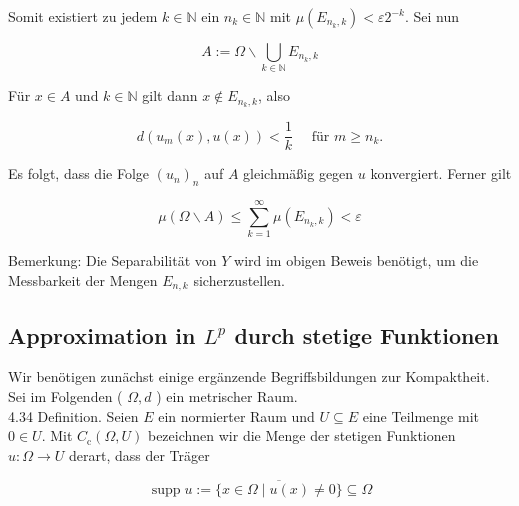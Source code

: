 \documentclass[10pt, letterpaper]{article}
\begin{document}
Somit existiert zu jedem $k \in \mathbb{N}$ ein $n_{k} \in \mathbb{N}$ mit $\mu\left(E_{n_{k}, k}\right)<\varepsilon 2^{-k}$. Sei nun

$$
A:=\Omega \backslash \bigcup_{k \in \mathbb{N}} E_{n_{k}, k}
$$

Für $x \in A$ und $k \in \mathbb{N}$ gilt dann $x \notin E_{n_{k}, k}$, also

$$
d\left(u_{m}(x), u(x)\right)<\frac{1}{k} \quad \text { für } m \geq n_{k} .
$$

Es folgt, dass die Folge $\left(u_{n}\right)_{n}$ auf $A$ gleichmäßig gegen $u$ konvergiert. Ferner gilt

$$
\mu(\Omega \backslash A) \leq \sum_{k=1}^{\infty} \mu\left(E_{n_{k}, k}\right)<\varepsilon
$$

Bemerkung: Die Separabilität von $Y$ wird im obigen Beweis benötigt, um die Messbarkeit der Mengen $E_{n, k}$ sicherzustellen.

\subsection*{Approximation in $L^{p}$ durch stetige Funktionen}
Wir benötigen zunächst einige ergänzende Begriffsbildungen zur Kompaktheit. Sei im Folgenden ( $\Omega, d$ ) ein metrischer Raum.\\
4.34 Definition. Seien $E$ ein normierter Raum und $U \subseteq E$ eine Teilmenge mit $0 \in U$. Mit $C_{\mathrm{c}}(\Omega, U)$ bezeichnen wir die Menge der stetigen Funktionen $u: \Omega \rightarrow U$ derart, dass der Träger

$$
\operatorname{supp} u:=\overline{\{x \in \Omega \mid u(x) \neq 0\}} \subseteq \Omega
$$
\end{document}
